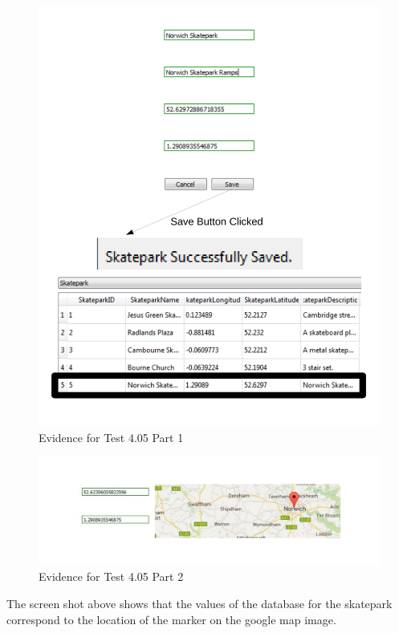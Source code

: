 \begin{figure}[H]
    \includegraphics[width=\textwidth]{./Testing/AnnotatedSamples/Test309.pdf}
    \caption{Evidence for Test 4.05 Part 1} \label{fig:Test 4.05 p1}
\end{figure}

\begin{figure}[H]
    \includegraphics[width=\textwidth]{./Testing/AnnotatedSamples/Test405.pdf}
    \caption{Evidence for Test 4.05 Part 2} \label{fig:Test 4.05 p2}
\end{figure}

The screen shot above shows that the values of the database for the skatepark correspond to the location of the marker on the google map image.

